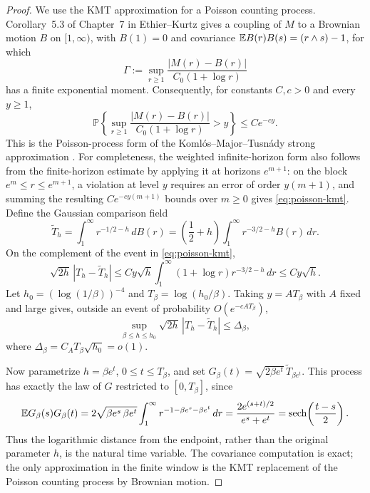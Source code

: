 \begin{proof}
We use the KMT approximation for a Poisson counting process. Corollary~5.3
of Chapter~7 in Ethier--Kurtz
\cite[pp.~358--359]{ethier1986markov} gives a coupling of \(M\) to a Brownian
motion \(B\) on \([1,\infty)\), with \(B(1)=0\) and covariance
\(\mathbb{E} B(r)B(s)=(r\wedge s)-1\), for which
\[
    \Gamma
    :=
    \sup_{r\ge1}
    \frac{|M(r)-B(r)|}{C_0(1+\log r)}
\]
has a finite exponential moment. Consequently, for constants \(C,c>0\) and
every \(y\ge1\),
\begin{equation}
\label{eq:poisson-kmt}
    \mathbb P\left\{
        \sup_{r\ge1}
        \frac{|M(r)-B(r)|}{C_0(1+\log r)}>y
    \right\}
    \le
    Ce^{-cy}.
\end{equation}
This is the Poisson-process form of the Komlós--Major--Tusnády strong
approximation \cite{komlos1975approximation,komlos1976approximation}.
For completeness, the weighted infinite-horizon form also follows from the
finite-horizon estimate by applying it at horizons \(e^{m+1}\): on the block
\(e^m\le r\le e^{m+1}\), a violation at level \(y\) requires an error of
order \(y(m+1)\), and summing the resulting
\(Ce^{-cy(m+1)}\) bounds over \(m\ge0\) gives \eqref{eq:poisson-kmt}.
Define the Gaussian comparison field
\[
    \widetilde T_h
    =
    \int_1^\infty r^{-1/2-h}\,dB(r)
    =
    \left(\frac12+h\right)
    \int_1^\infty r^{-3/2-h}B(r)\,dr.
\]
On the complement of the event in \eqref{eq:poisson-kmt},
\[
    \sqrt{2h}\,|T_h-\widetilde T_h|
    \le
    C y\sqrt h
    \int_1^\infty (1+\log r)r^{-3/2-h}\,dr
    \le
    C y\sqrt h.
\]
Let $h_0=(\log(1/\beta))^{-4}$ and $T_\beta=\log(h_0/\beta)$. Taking $y=AT_\beta$ with $A$ fixed and large gives, outside an event of probability $O(e^{-cAT_\beta})$,
\begin{equation}
\label{eq:poisson-brownian-window}
    \sup_{\beta\le h\le h_0}
    \sqrt{2h}\,|T_h-\widetilde T_h|
    \le
    \Delta_\beta,
\end{equation}
where $\Delta_\beta=C_A T_\beta\sqrt{h_0}=o(1)$.

Now parametrize $h=\beta e^t$, $0\le t\le T_\beta$, and set $G_\beta(t)=\sqrt{2\beta e^t}\,\widetilde T_{\beta e^t}$.
This process has exactly the law of $G$ restricted to $[0,T_\beta]$, since
\[
    \mathbb{E} G_\beta(s)G_\beta(t)
    =
    2\sqrt{\beta e^s\,\beta e^t}
    \int_1^\infty r^{-1-\beta e^s-\beta e^t}\,dr
    =
    \frac{2e^{(s+t)/2}}{e^s+e^t}
    =
    \operatorname{sech}\!\left(\frac{t-s}{2}\right).
\]
Thus the logarithmic distance from the endpoint, rather than the original
parameter $h$, is the natural time variable. The covariance computation is
exact; the only approximation in the finite window is the KMT replacement of
the Poisson counting process by Brownian motion.


\end{proof}
